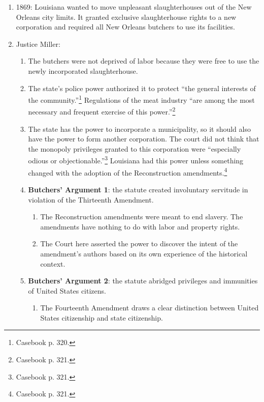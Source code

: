 \begin{enumerate}
    \item 1869: Louisiana wanted to move unpleasant slaughterhouses out of the 
    New Orleans city limits. It granted exclusive slaughterhouse rights to a 
    new corporation and required all New Orleans butchers to use its 
    facilities.  \item Justice Miller:
    \begin{enumerate}
        \item The butchers were not deprived of labor because they were free 
        to use the newly incorporated slaughterhouse.
        \item The state's police power authorized it to protect ``the general 
        interests of the community.''\footnote{Casebook p. 320.} Regulations of 
        the meat industry ``are among the most necessary and frequent exercise 
        of this power.''\footnote{Casebook p. 321.}
        \item The state has the power to incorporate a municipality, so it 
        should also have the power to form another corporation. The court did 
        not think that the monopoly privileges granted to this corporation 
        were ``especially odious or objectionable.''\footnote{Casebook p. 
        321.} Louisiana had this power unless something changed with the 
        adoption of the Reconstruction amendments.\footnote{Casebook p. 321.}
        \item \textbf{Butchers' Argument 1}: the statute created involuntary 
        servitude in violation of the Thirteenth Amendment.
        \begin{enumerate}
            \item The Reconstruction amendments were meant to end slavery. 
            The amendments have nothing to do with labor and property rights.
            \item The Court here asserted the power to discover the intent of 
            the amendment's authors based on its own experience of the 
            historical context.
        \end{enumerate}
        \item \textbf{Butchers' Argument 2}: the statute abridged privileges and 
        immunities of United States citizens.
        \begin{enumerate}
            \item The Fourteenth Amendment draws a clear distinction between 
            United States citizenship and state citizenship.

\end{enumerate}
\end{enumerate}
\end{enumerate}
